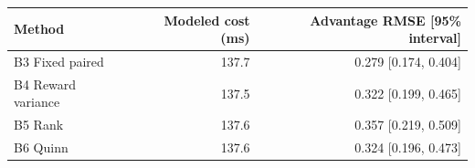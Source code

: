 \begin{tabular}{lrr}
\hline
Method & Modeled cost (ms) & Advantage RMSE [95\% interval] \\
\hline
B3 Fixed paired & 137.7 & 0.279 [0.174, 0.404] \\
B4 Reward variance & 137.5 & 0.322 [0.199, 0.465] \\
B5 Rank & 137.6 & 0.357 [0.219, 0.509] \\
B6 Quinn & 137.6 & 0.324 [0.196, 0.473] \\
\hline
\end{tabular}
